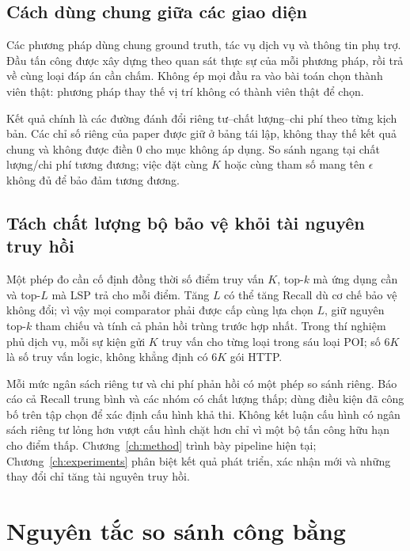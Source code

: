 \documentclass[12pt,a4paper,oneside]{report}
\begin{document}
\subsection{Cách dùng chung giữa các giao diện}

Các phương pháp dùng chung ground truth, tác vụ dịch vụ và thông tin phụ trợ. Đầu tấn công được xây dựng theo quan sát thực sự của mỗi phương pháp, rồi trả về cùng loại đáp án cần chấm. Không ép mọi đầu ra vào bài toán chọn thành viên thật: phương pháp thay thế vị trí không có thành viên thật để chọn.

Kết quả chính là các đường đánh đổi riêng tư--chất lượng--chi phí theo từng kịch bản. Các chỉ số riêng của paper được giữ ở bảng tái lập, không thay thế kết quả chung và không được điền 0 cho mục không áp dụng. So sánh ngang tại chất lượng/chi phí tương đương; việc đặt cùng $K$ hoặc cùng tham số mang tên $\epsilon$ không đủ để bảo đảm tương đương.

\subsection{Tách chất lượng bộ bảo vệ khỏi tài nguyên truy hồi}

Một phép đo cần cố định đồng thời số điểm truy vấn $K$, top-$k$ mà ứng dụng cần và top-$L$ mà LSP trả cho mỗi điểm. Tăng $L$ có thể tăng Recall dù cơ chế bảo vệ không đổi; vì vậy mọi comparator phải được cấp cùng lựa chọn $L$, giữ nguyên top-$k$ tham chiếu và tính cả phản hồi trùng trước hợp nhất. Trong thí nghiệm phủ dịch vụ, mỗi sự kiện gửi $K$ truy vấn cho từng loại trong sáu loại POI; số $6K$ là số truy vấn logic, không khẳng định có $6K$ gói HTTP.

Mỗi mức ngân sách riêng tư và chi phí phản hồi có một phép so sánh riêng. Báo cáo cả Recall trung bình và các nhóm có chất lượng thấp; dùng điều kiện đã công bố trên tập chọn để xác định cấu hình khả thi. Không kết luận cấu hình có ngân sách riêng tư lỏng hơn vượt cấu hình chặt hơn chỉ vì một bộ tấn công hữu hạn cho điểm thấp. Chương~\ref{ch:method} trình bày pipeline hiện tại; Chương~\ref{ch:experiments} phân biệt kết quả phát triển, xác nhận mới và những thay đổi chỉ tăng tài nguyên truy hồi.

\section{Nguyên tắc so sánh công bằng}
\end{document}
